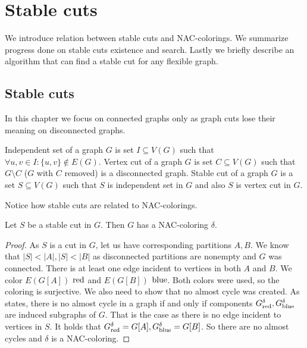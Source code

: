 
\chapter{Stable cuts}%
\label{chapter:stable_cuts}

\begin{chapterabstract}
	We introduce relation between stable cuts and NAC-colorings.
	We summarize progress done on stable cuts existence and search.
	Lastly we briefly describe an algorithm that can find a stable cut
	for any flexible graph.
\end{chapterabstract}

\section{Stable cuts}

In this chapter we focus on connected graphs only as graph cuts lose their
meaning on disconnected graphs.
%
\begin{definition}
	Independent set of a graph \( G \) is set \( I \subseteq V(G) \)
	such that \( \forall u, v \in I : \{u, v\} \not\in E(G) \).
	Vertex cut of a graph \( G \) is set \( C \subseteq V(G) \)
	such that \( G \setminus C \) (\( G \) with \( C \) removed)
	is a disconnected graph.
	Stable cut of a graph \( G \) is a set \( S \subseteq V(G) \) such that
	\( S \) is independent set in \( G \) and also \( S \) is vertex cut in \( G \).
\end{definition}
%

Notice how stable cuts are related to NAC-colorings.
%
\begin{lemma}
	Let \( S \) be a stable cut in \( G \).
	Then \( G \) has a NAC-coloring \( \delta \).
\end{lemma}
%
\begin{proof}
	As \( S \) is a cut in \( G \), let us have corresponding partitions \( A, B \).
	We know that \( |S| < |A|, |S| < |B| \)
	as disconnected partitions are nonempty and \( G \) was connected.
	There is at least one edge incident to vertices in both \( A \) and \( B \).
	We color \( E(G[A]) \) \( \text{red} \) and \( E(G[B]) \) \( \text{blue} \).
	Both colors were used, so the coloring is surjective.
	We also need to show that no almost cycle was created.
	As~\cite[Lemma 2.4]{legersky_original} states, there is no almost cycle
	in a graph if and only if components \( G_{\text{red}}^\delta, G_{\text{blue}}^\delta \)
	are induced subgraphs of \( G \).
	That is the case as there is no edge incident to vertices in \( S \).
	It holds that \( G_{\text{red}}^\delta = G[A], G_{\text{blue}}^\delta = G[B] \).
	So there are no almost cycles and \( \delta \) is a NAC-coloring.
\end{proof}
%

